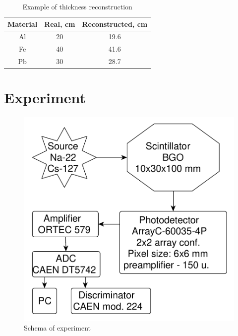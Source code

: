 \documentclass[a4paper]{panl}
\begin{document}
\begin{table}
\begin{center}
        \begin{tabular}[c]{|c|c|c|}
        \hline 
        Material & Real, cm & Reconstructed, cm \\ 
        \hline 
        Al & 20 & 19.6 \\ 
        \hline 
        Fe & 40 & 41.6 \\ 
        \hline 
        Pb & 30 & 28.7 \\ 
        \hline 
    \end{tabular}
\end{center}
\caption{Example of thickness reconstruction}
    \label{tab:rec}
\end{table}


\section*{Experiment}
\begin{figure} 
    \includegraphics[width=\linewidth]{figures/yed.pdf}  
    \vspace{-3mm}
    \caption{Schema of experiment}
    \vspace{-5mm}
\end{figure}
\end{document}
